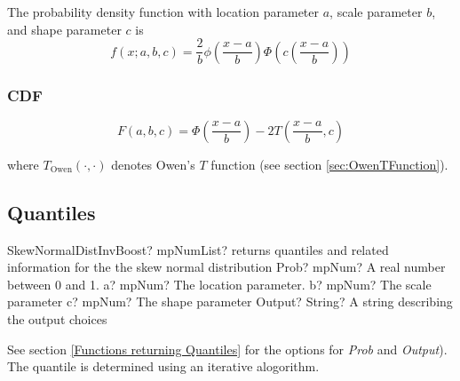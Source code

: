 
The probability density function with location parameter $a$, scale parameter $b$, and shape parameter $c$  is
\begin{equation} 
f(x;a,b,c)= \frac{2}{b} \phi \left(\frac{x-a}{b}\right)  \Phi \left(c \left(\frac{x-a}{b}\right)\right)  
\end{equation}


\subsubsection{CDF}
\label{SkewNormalDistributionCDF}


\begin{equation} 
F(a,b,c)=  \Phi \left(\frac{x-a}{b}\right) -  2T \left(\frac{x-a}{b}, c \right)
\end{equation}

where  $T_{\text{Owen}}(\cdot,\cdot)$ denotes Owen's $T$ function (see section \ref{sec:OwenTFunction}).

\subsection{Quantiles}
\label{SkewNormalDistributionQuantiles}



\begin{mpFunctionsExtract}
	\mpFunctionFiveNotImplemented
	{SkewNormalDistInvBoost? mpNumList? returns quantiles and related information for the the skew normal distribution}
	{Prob? mpNum? A real number between 0 and 1.}
	{a? mpNum? The location parameter.}
	{b? mpNum? The scale parameter}
	{c? mpNum? The shape parameter}
	{Output? String? A string describing the output choices}
\end{mpFunctionsExtract}

\vspace{0.3cm}
See section \ref{Functions returning Quantiles} for the options for  {\itshape\sffamily Prob} and {\itshape\sffamily Output}). 
The quantile is determined using an iterative alogorithm.


